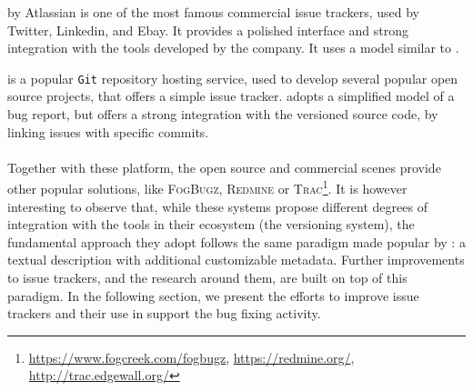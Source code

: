  \jira by Atlassian is one of the most famous commercial issue trackers, used by Twitter, Linkedin, and Ebay. It provides a polished interface and strong integration with the tools developed by the company. It uses a model similar to \bzilla.


 \gth is a popular \texttt{Git} repository hosting service, used to develop several popular open source projects, that offers a simple issue tracker. \gth adopts a simplified model of a bug report, but offers a strong integration with the versioned source code, by linking issues with specific commits.


\paragraph{}
Together with these platform, the open source and commercial scenes provide other popular solutions, like \textsc{FogBugz}, \textsc{Redmine} or \textsc{Trac}\footnote{\url{https://www.fogcreek.com/fogbugz}, \url{https://redmine.org/}, \url{http://trac.edgewall.org/}}. It is however interesting to observe that, while these systems propose different degrees of integration with the tools in their ecosystem (\eg the versioning system), the fundamental approach they adopt follows the same paradigm made popular by \bzilla: a textual description with additional customizable metadata. Further improvements to issue trackers, and the research around them, are built on top of this paradigm. In the following section, we present the efforts to improve issue trackers and their use in support the bug fixing activity.


